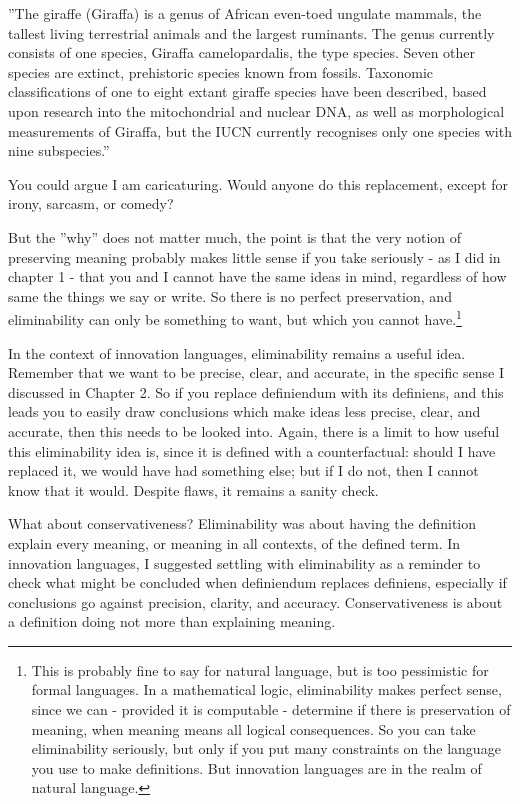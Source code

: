 \documentclass[graybox,envcountchap,sectrefs]{svmono}
\begin{document}
\begin{svgraybox}
''The giraffe (Giraffa) is a genus of African even-toed ungulate mammals, the tallest living terrestrial animals and the largest ruminants. The genus currently consists of one species, Giraffa camelopardalis, the type species. Seven other species are extinct, prehistoric species known from fossils. Taxonomic classifications of one to eight extant giraffe species have been described, based upon research into the mitochondrial and nuclear DNA, as well as morphological measurements of Giraffa, but the IUCN currently recognises only one species with nine subspecies.'' \cite{wikipedia-giraffe}
\end{svgraybox}

You could argue I am caricaturing. Would anyone do this replacement, except for irony, sarcasm, or comedy? 

But the ''why'' does not matter much, the point is that the very notion of preserving meaning probably makes little sense if you take seriously - as I did in chapter 1 - that you and I cannot have the same ideas in mind, regardless of how same the things we say or write. So there is no perfect preservation, and eliminability can only be something to want, but which you cannot have.\footnote{This is probably fine to say for natural language, but is too pessimistic for formal languages. In a mathematical logic, eliminability makes perfect sense, since we can - provided it is computable - determine if there is preservation of meaning, when meaning means all logical consequences. So you can take eliminability seriously, but only if you put many constraints on the language you use to make definitions. But innovation languages are in the realm of natural language.}

In the context of innovation languages, eliminability remains a useful idea. Remember that we want to be precise, clear, and accurate, in the specific sense I discussed in Chapter 2. So if you replace definiendum with its definiens, and this leads you to easily draw conclusions which make ideas less precise, clear, and accurate, then this needs to be looked into. Again, there is a limit to how useful this eliminability idea is, since it is defined with a counterfactual: should I have replaced it, we would have had something else; but if I do not, then I cannot know that it would. Despite flaws, it remains a sanity check. 

What about conservativeness? Eliminability was about having the definition explain every meaning, or meaning in all contexts, of the defined term. In innovation languages, I suggested settling with eliminability as a reminder to check what might be concluded when definiendum replaces definiens, especially if conclusions go against precision, clarity, and accuracy. Conservativeness is about a definition doing not more than explaining meaning. 
\end{document}
